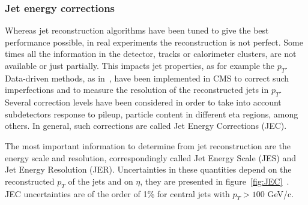 \subsubsection{Jet energy corrections}
\label{sec:JEC}

Whereas jet reconstruction algorithms have been tuned to give the best performance possible, in real experiments the reconstruction is not perfect. Some times all the information in the detector, tracks or calorimeter clusters, are not available or just partially. This impacts jet properties, as for example the $p_{T}$. Data-driven methods, as in~\cite{2011JInst...611002C}, have been implemented in CMS to correct such imperfections and to measure the resolution of the reconstructed jets in $p_{T}$. Several correction levels have been considered in order to take into account subdetectors response to pileup, particle content in different eta regions, among others. In general, such corrections are called Jet Energy Corrections (JEC). 

The most important information to determine from jet reconstruction are the energy scale and resolution, correspondingly called Jet Energy Scale (JES) and Jet Energy Resolution (JER). Uncertainties in these quantities depend on the reconstructed $p_{T}$ of the jets and on $\eta$, they are presented in figure~\ref{fig:JEC}~\cite{Brochet:1956723}. JEC uncertainties are of the order of 1\% for central jets with $p_{T}>100$ GeV/c.

